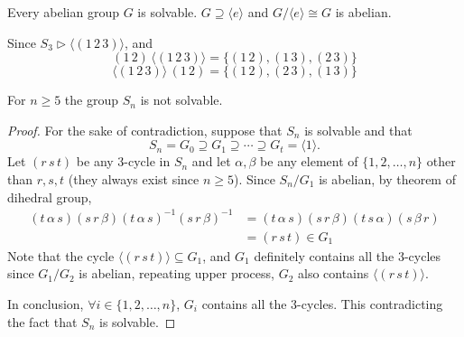 \begin{example}
    Every abelian group $G$ is solvable. $G \supseteq \langle e \rangle$ and $G/\langle e \rangle \cong G$ 
    is abelian.
\end{example}
\begin{solution}
    Since $S_3 \triangleright \langle (1\, 2\, 3) \rangle$, and 
    \[
        (1\, 2) \, \langle (1\, 2\, 3) \rangle = \{ (1 \, 2), (1 \, 3), (2\, 3)\}
    \]
    \[
        \langle (1\, 2\, 3) \rangle\, (1\, 2) = \{ (1 \, 2), (2 \, 3), (1\, 3)\}
    \]
\end{solution}

\begin{theorem}
    For $n \geq 5$ the group $S_n$ is not solvable.
\end{theorem}
\begin{proof}
    For the sake of contradiction, suppose that 
    $S_n$ is solvable and that 
    \[
        S_n = G_0 \supseteq G_1 \supseteq \cdots \supseteq G_t = \langle 1 \rangle.
    \] 
    Let $(r\, s\, t)$ be any 3-cycle in $S_n$ and let $\alpha, \beta$ be any 
    element of $\{1, 2, \ldots, n\}$ other than $r, s, t$ (they always exist since $n \geq 5$).
    Since $S_n / G_1$ is abelian, by theorem of dihedral group,
    \begin{align*}
        (t\, \alpha\, s)(s\, r\, \beta)(t\, \alpha\, s)^{-1} (s\, r\, \beta)^{-1} &= 
        (t\, \alpha\, s)(s\, r\, \beta)(t\, s\, \alpha)(s\, \beta\, r)\\
        &= (r\, s\, t) \in G_1
    \end{align*}
    Note that the cycle $\langle (r\, s\, t) \rangle \subseteq G_1$, and $G_1$ definitely contains all the 3-cycles 
    since $G_1/G_2$ is abelian, repeating upper process, $G_2$ also contains $\langle (r\, s\, t) \rangle$.
    
    In conclusion, $\forall i \in \{1,2,\ldots, n\}$, $G_i$ contains all the 3-cycles. This contradicting the fact 
    that $S_n$ is solvable.
\end{proof}

